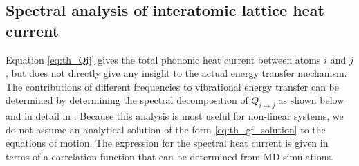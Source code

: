 

\subsection{Spectral analysis of interatomic lattice heat current}
\label{sec:th_spectral_curr}
Equation \eqref{eq:th_Qij} gives the total phononic heat current between atoms $i$ and $j$, but does not directly give any insight to the actual energy transfer mechanism. The contributions of different frequencies to vibrational energy transfer can be determined by determining the spectral decomposition of $Q_{i\to j}$ as shown below and in detail in . Because this analysis is most useful for non-linear systems, we do not assume an analytical solution of the form \eqref{eq:th_gf_solution} to the equations of motion. The expression for the spectral heat current is given in terms of a correlation function that can be determined from MD simulations.

